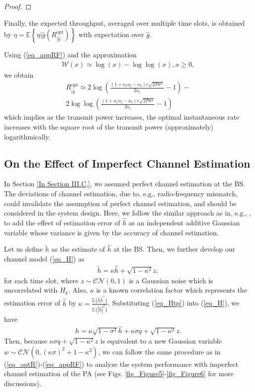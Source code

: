 \begin{proof}
\end{proof}

Finally, the expected throughput, averaged over multiple time slots, is obtained by $\eta = \mathbb{E}\left\{\eta|{\hat {g}}(R_{|\hat{g}}^{\text{opt}})\right\}$ with expectation over $\hat g$.  

Using (\ref{eq_appRF}) and the approximation \cite[Them. 2.1]{hoorfar2007approximation}
\begin{align}
    \mathcal{W}(x) \simeq \log(x)-\log\log(x), x\geq0,
\end{align}
we obtain
\begin{align}
    R_{|\hat{g}}^{\text{opt}}\simeq 2\log\left(\frac{(1+o_1o_2-o_3)e\sqrt{2P\sigma^2}}{2o_1}-1\right)-\nonumber\\
    2\log\log\left(\frac{(1+o_1o_2-o_3)e\sqrt{2P\sigma^2}}{2o_1}-1\right)
\end{align}
which implies as the transmit power increases, the optimal instantaneous rate increases with the square root of the transmit power (approximately) logarithmically.

\subsection{On the Effect of Imperfect Channel Estimation}
In Section \ref{In Section III.C,}, we assumed perfect channel estimation at the BS. The deviations of channel estimation, due to, e.g., radio-frequency mismatch, could invalidate the assumption of perfect channel estimation, and should be considered in the system design. Here, we follow the similar approach as in, e.g., \cite{Wang2007TWCperformance}, to add the effect of estimation error of $\hat{h}$ as an independent additive Gaussian variable whose variance is given by the accuracy of channel estimation. 

Let us define $\tilde h$ as the estimate of $\hat h$ at the BS. Then,  we further develop our channel model  (\ref{eq_H}) as
\begin{align}\label{eq_Htp}
    \tilde{h} = \kappa \hat{h} + \sqrt{1-\kappa^2} z, 
\end{align}
for each time slot, where $z \sim \mathcal{CN}(0,1)$ is a Gaussian noise which is uncorrelated with $H_{k}$. Also, $\kappa$ is a known correlation factor which represents the estimation error of $\hat{h}$ by $\kappa = \frac{\mathbb{E}\{\tilde{h}\hat{h}^*\}}{\mathbb{E}\{|\hat{h}|^2\}}$. Substituting (\ref{eq_Htp}) into (\ref{eq_H}), we have
\begin{align}\label{eq_Ht}
    h = \kappa\sqrt{1-\sigma^2}\hat{h}+\kappa\sigma q+\sqrt{1-\kappa^2}z.
\end{align}
Then, because  $\kappa\sigma q + \sqrt{1-\kappa^2}z$ is equivalent to a new Gaussian variable\\ $w \sim\mathcal{CN}\left(0,(\kappa\sigma)^2+1-\kappa^2\right)$, we can follow the same procedure as in (\ref{eq_optR})-(\ref{eq_appRF}) to analyze the system performance with imperfect channel estimation of the PA (see Figs. \ref{fig_Figure5}-\ref{fig_Figure6} for more discussions).



